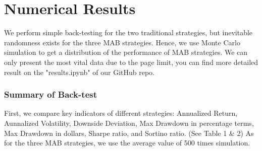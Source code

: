 \documentclass{article}
\begin{document}
\section{Numerical Results}
We perform simple back-testing for the two traditional strategies, but inevitable randomness exists for the three MAB strategies. Hence, we use Monte Carlo simulation to get a distribution of the performance of MAB strategies. We can only present the most vital data due to the page limit, you can find more detailed result on the "results.ipynb" of our GitHub repo.

\subsubsection{Summary of Back-test}
First, we compare key indicators of different strategies: Annualized Return, Aunnalized Volatility, Downside Deviation, Max Drawdown in percentage terms, Max Drawdown in dollars,  Sharpe ratio, and Sortino ratio. (See Table 1 & 2)
As for the three MAB strategies, we use the average value of 500 times simulation.
\end{document}
